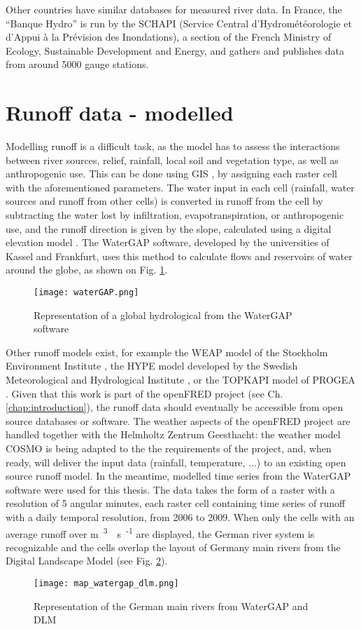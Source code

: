 Other countries have similar databases for measured river data. In France, the ``Banque Hydro'' is run by the SCHAPI (Service Central d'Hydrométéorologie et d'Appui à la Prévision des Inondations), a section of the French Ministry of Ecology, Sustainable Development and Energy, and gathers and publishes data from around 5000 gauge stations.

\section{Runoff data - modelled}

\label{sec:mod_runoff}
Modelling runoff is a difficult task, as the model has to assess the interactions between river sources, relief, rainfall, local soil and vegetation type, as well as anthropogenic use. This can be done using GIS \cite{bayazit}, by assigning each raster cell with the aforementioned parameters. The water input in each cell (rainfall, water sources and runoff from other cells) is converted in runoff from the cell by subtracting the water lost by infiltration, evapotranspiration, or anthropogenic use, and the runoff direction is given by the slope, calculated using a digital elevation model \cite{heywood}. \newline
The WaterGAP software, developed by the universities of Kassel and Frankfurt, uses this method to calculate flows and reservoirs of water around the globe, as shown on Fig. \ref{waterGAP}.
\begin{figure}[H]
\centering
\texttt{[image: waterGAP.png]}
\caption[Representation of a global hydrological from the WaterGAP software]{Representation of a global hydrological from the WaterGAP software \cite{doll}}
\label{waterGAP}
\end{figure}
Other runoff models exist, for example the WEAP model of the Stockholm Environment Institute \cite{weap}, the HYPE model developed by the Swedish Meteorological and Hydrological Institute \cite{hype}, or the TOPKAPI model of PROGEA \cite{topkapi}. \newline
Given that this work is part of the openFRED project (see Ch. \ref{chap:introduction}), the runoff data should eventually be accessible from open source databases or software. The weather aspects of the openFRED project are handled together with the Helmholtz Zentrum Geesthacht: the weather model COSMO is being adapted to the the requirements of the project, and, when ready, will deliver the input data (rainfall, temperature, ...) to an existing open source runoff model. \newline
In the meantime, modelled time series from the WaterGAP software were used for this thesis. The data takes the form of a raster with a resolution of 5 angular minutes, each raster cell containing time series of runoff with a daily temporal resolution, from 2006 to 2009. When only the cells with an average runoff over \unit[100]{m\textsuperscript{3}\textperiodcentered s\textsuperscript{-1}} are displayed, the German river system is recognizable and the cells overlap the layout of Germany main rivers from the Digital Landscape Model \cite{dlm250} (see Fig. \ref{map_watergap_dlm}).

\begin{figure}[H]
\centering
\texttt{[image: map\_watergap\_dlm.png]}
\caption[Representation of the German main rivers from WaterGAP and DLM]{Representation of the German main rivers from WaterGAP and DLM}
\label{map_watergap_dlm}
\end{figure}
